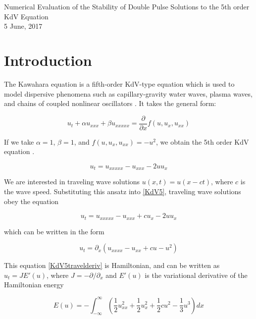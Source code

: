 \documentclass[12pt]{article}
\begin{document}
\begin{center}
{\LARGE Numerical Evaluation of the Stability of Double Pulse Solutions to the 5th order KdV Equation}\\
\vspace{5mm}
{\large 5 June, 2017}\\
\end{center}

\section{Introduction}

The Kawahara equation is a fifth-order KdV-type equation which is used to model dispersive phenomena such as capillary-gravity water waves, plasma waves, and chains of coupled nonlinear oscillators \cite{Bridges2002,Champneys1998}. It takes the general form:

\begin{equation} \label{kawahara}
u_t + \alpha u_{xxx} + \beta u_{xxxxx} = \frac{\partial}{\partial x} f(u, u_x, u_{xx})
\end{equation}

If we take $\alpha = 1$, $\beta = 1$, and $f(u, u_x, u_{xx}) = -u^2$, we obtain the 5th order KdV equation \cite{Pelinovsky2007}. 

\begin{equation} \label{KdV5}
u_t = u_{xxxxx} - u_{xxx} - 2 u u_x
\end{equation}

We are interested in traveling wave solutions $u(x, t) = u(x - ct)$, where $c$ is the wave speed. Substituting this ansatz into \eqref{KdV5}, traveling wave solutions obey the equation

\begin{equation} \label{KdV5travel}
u_t = u_{xxxxx} - u_{xxx} + c u_x - 2 u u_x
\end{equation}

which can be written in the form

\begin{equation} \label{KdV5travelderiv}
u_t = \partial_x ( u_{xxxx} - u_{xx} + c u - u^2 )
\end{equation}

This equation \eqref{KdV5travelderiv} is Hamiltonian, and can be written as $u_t = J E'(u)$, where $J = -\partial / \partial_x$ and $E'(u)$ is the variational derivative of the Hamiltonian energy

\begin{equation} \label{Hamiltonian}
E(u) = -\int_{-\infty}^{\infty} \left( \frac{1}{2}u_{xx}^2 + \frac{1}{2}u_x^2 + \frac{1}{2}cu^2 - \frac{1}{3}u^3 \right) dx
\end{equation}
\end{document}
